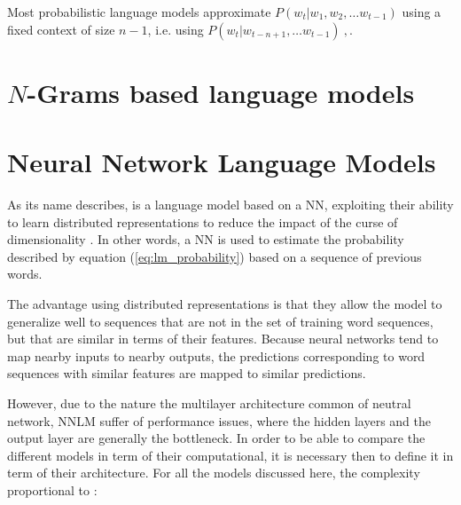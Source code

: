 Most probabilistic language models  approximate $P(w_t | w_1, w_2, \ldots
w_{t-1})$ using a fixed context of size $n-1$, i.e. using  $P(w_t | w_{t-n+1}, \ldots w_{t-1})\ ,$.



\section{$N$-Grams based language models}
\label{sec:n-gram-lm}




\section{Neural Network Language Models}
\label{sec:nnlms-intro}

As its name describes, is a language model based on a \ac{NN}, exploiting their
ability to learn distributed representations to reduce the impact of the
curse of dimensionality \cite{Bengio:2008}. In other words, a \ac{NN} is
used to estimate the probability described  by equation (\ref{eq:lm_probability}) based on a sequence of
previous words.

The advantage  using  distributed representations  is that they allow
the model to generalize well to sequences that are not in the set of training
word sequences, but that are similar in terms of their features. Because neural networks tend to map nearby inputs
to nearby outputs, the predictions corresponding to word sequences with
similar features are mapped to similar predictions. \cite{Bengio:2008,Bengio:2003:NPL:944919.944966}

However, due to the nature the multilayer architecture common of neutral
network, \ac{NNLM}  suffer of 
performance issues, where the hidden layers and the output layer are
generally the bottleneck. In order to be able to compare the different
models in term of their computational, it is necessary then to define it in
term of their architecture. For all the models discussed here, the  complexity proportional to \cite{DBLP:journals/corr/abs-1301-3781}:

